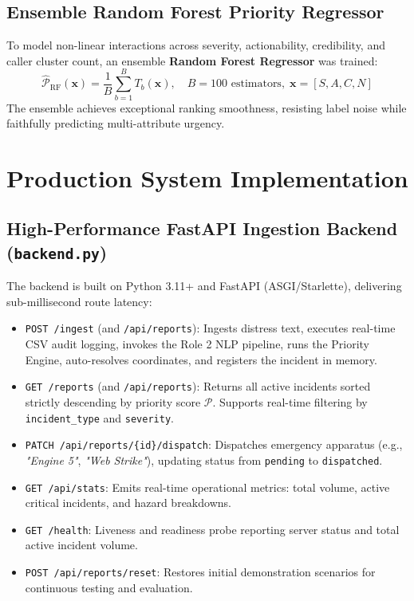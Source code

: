 \documentclass[10pt,a4paper]{article}
\begin{document}
\subsection{Ensemble Random Forest Priority Regressor}
To model non-linear interactions across severity, actionability, credibility, and caller cluster count, an ensemble \textbf{Random Forest Regressor} was trained:
\begin{equation}
  \hat{\mathcal{P}}_{\text{RF}}(\mathbf{x}) = \frac{1}{B}\sum_{b=1}^B T_b(\mathbf{x}), \quad B = 100 \text{ estimators}, \; \mathbf{x} = [S, A, C, N]
\end{equation}
The ensemble achieves exceptional ranking smoothness, resisting label noise while faithfully predicting multi-attribute urgency.


\section{Production System Implementation}
\subsection{High-Performance FastAPI Ingestion Backend (\texttt{backend.py})}
The backend is built on Python 3.11+ and FastAPI (ASGI/Starlette), delivering sub-millisecond route latency:
\begin{itemize}
  \item \texttt{POST /ingest} (and \texttt{/api/reports}): Ingests distress text, executes real-time CSV audit logging, invokes the Role 2 NLP pipeline, runs the Priority Engine, auto-resolves coordinates, and registers the incident in memory.
  \item \texttt{GET /reports} (and \texttt{/api/reports}): Returns all active incidents sorted strictly descending by priority score $\mathcal{P}$. Supports real-time filtering by \texttt{incident\_type} and \texttt{severity}.
  \item \texttt{PATCH /api/reports/\{id\}/dispatch}: Dispatches emergency apparatus (e.g., \emph{"Engine 5"}, \emph{"Web Strike"}), updating status from \texttt{pending} to \texttt{dispatched}.
  \item \texttt{GET /api/stats}: Emits real-time operational metrics: total volume, active critical incidents, and hazard breakdowns.
  \item \texttt{GET /health}: Liveness and readiness probe reporting server status and total active incident volume.
  \item \texttt{POST /api/reports/reset}: Restores initial demonstration scenarios for continuous testing and evaluation.
\end{itemize}
\end{document}
